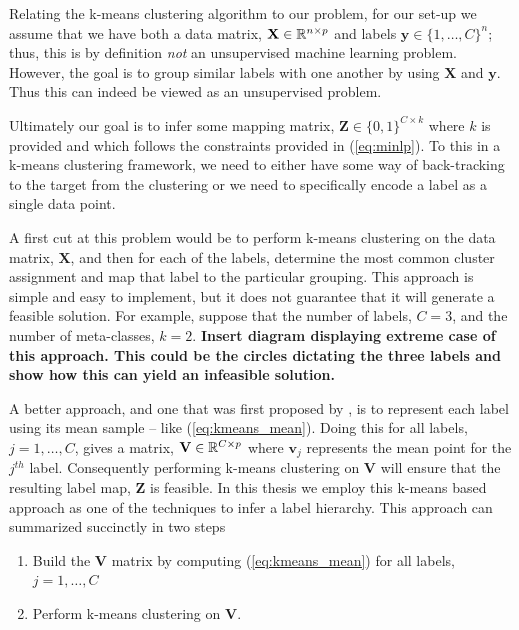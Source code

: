 \documentclass[../thesis.tex]{subfiles}
\begin{document}
Relating the k-means clustering algorithm to our problem, for our set-up we assume that we have both a data matrix, $\mathbf{X} \in \mathbb{R}^{n \times p}$ and labels $\mathbf{y} \in \{1, \ldots, C\}^n$; thus, this is by definition \textit{not} an unsupervised machine learning problem. However, the goal is to group similar labels with one another by using $\mathbf{X}$ and $\mathbf{y}$. Thus this can indeed be viewed as an unsupervised problem. 

Ultimately our goal is to infer some mapping matrix, $\mathbf{Z} \in \{0, 1\}^{C \times k}$ where $k$ is provided and which follows the constraints provided in (\ref{eq:minlp}). To this in a k-means clustering framework, we need to either have some way of back-tracking to the target from the clustering or we need to specifically encode a label as a single data point. 

A first cut at this problem would be to perform k-means clustering on the data matrix, $\mathbf{X}$, and then for each of the labels, determine the most common cluster assignment and map that label to the particular grouping. This approach is simple and easy to implement, but it does not guarantee that it will generate a feasible solution. For example, suppose that the number of labels, $C = 3$, and the number of meta-classes, $k=2$. \textbf{Insert diagram displaying extreme case of this approach. This could be the circles dictating the three labels and show how this can yield an infeasible solution.}

A better approach, and one that was first proposed by \cite{vural2004hierarchical}, is to represent each label using its mean sample -- like (\ref{eq:kmeans_mean}). Doing this for all labels, $j = 1, \ldots, C$, gives a matrix, $\mathbf{V} \in \mathbb{R}^{C \times p}$ where $\mathbf{v}_j$ represents the mean point for the $j^{th}$ label. Consequently performing k-means clustering on $\mathbf{V}$ will ensure that the resulting label map, $\mathbf{Z}$ is feasible. In this thesis we employ this k-means based approach as one of the techniques to infer a label hierarchy. This approach can summarized succinctly in two steps
\begin{enumerate}
    \item Build the $\mathbf{V}$ matrix by computing (\ref{eq:kmeans_mean}) for all labels, $j = 1, \ldots, C$
    \item Perform k-means clustering on $\mathbf{V}$.
\end{enumerate}
\end{document}
